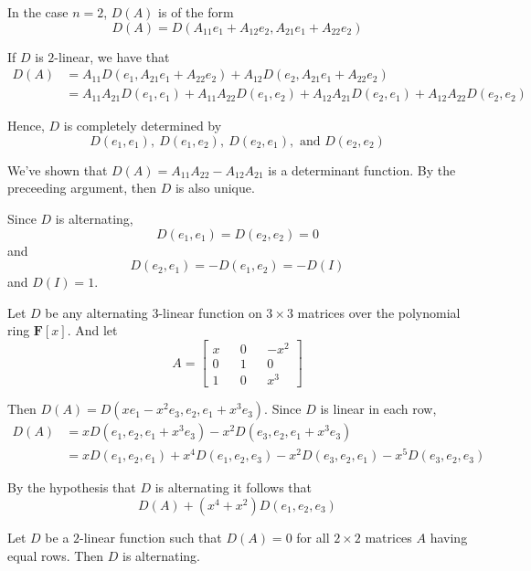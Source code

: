 In the case $n=2$, $D(A)$ is of the form
\[
	D(A) = D(A_{11}e_1 + A_{12}e_2, A_{21}e_1 + A_{22}e_2)
\]

If $D$ is $2$-linear, we have that
\begin{equation*}
	\begin{aligned}
		D(A) &= A_{11}D(e_1, A_{21}e_1 + A_{22}e_2) + A_{12}D(e_2, A_{21}e_1 + A_{22}e_2) \\
		&= A_{11} A_{21} D(e_1, e_1) + A_{11} A_{22} D(e_1, e_2) + A_{12} A_{21} D(e_2, e_1) + A_{12} A_{22} D(e_2, e_2)
	\end{aligned}
\end{equation*}

Hence, $D$ is completely determined by
\[
	D(e_1, e_1), ~D(e_1, e_2), ~D(e_2, e_1), \text{ and } D(e_2, e_2)
\]

We've shown that $D(A) = A_{11}A_{22} - A_{12}A_{21}$ is a determinant function. By the preceeding argument, then $D$ is also unique.

Since $D$ is alternating, 
\[
	D(e_1, e_1) = D(e_2, e_2) = 0
\]
and
\[
	D(e_2, e_1) = - D(e_1, e_2) = -D(I)
\]
and $D(I) = 1$.

\begin{example}
	Let $D$ be any alternating $3$-linear function on $3 \times 3$ matrices over the polynomial ring $\textbf{F}[x]$. And let
	\[
		A = \begin{bmatrix}
			x && 0 && -x^2 \\
			0 && 1 && 0 \\
			1 && 0 && x^3
		\end{bmatrix}
	\]

	Then $D(A) = D(xe_1 - x^2 e_3, e_2, e_1 + x^3e_3)$. Since $D$ is linear in each row,
	\begin{equation*}
		\begin{aligned}
		D(A) &= xD(e_1, e_2, e_1 + x^3 e_3) - x^2D(e_3, e_2, e_1 + x^3 e_3) \\
		&= xD(e_1, e_2, e_1) + x^4D(e_1, e_2, e_3) - x^2D(e_3, e_2, e_1) - x^5D(e_3, e_2, e_3)
		\end{aligned}
	\end{equation*}

	By the hypothesis that $D$ is alternating it follows that
	\[
		D(A) + (x^4 + x^2)D(e_1, e_2, e_3)
	\]
\end{example}

\begin{lemma}
	Let $D$ be a $2$-linear function such that $D(A) = 0$ for all $2 \times 2$ matrices $A$ having equal rows. Then $D$ is alternating.
\end{lemma}

